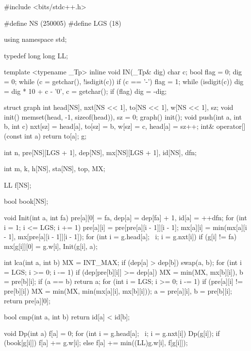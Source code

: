 \begin{cppcode}
#include <bits/stdc++.h>

#define NS (250005)
#define LGS (18)

using namespace std;

typedef long long LL;

template <typename _Tp>
inline void IN(_Tp& dig) {
  char c;
  bool flag = 0;
  dig = 0;
  while (c = getchar(), !isdigit(c))
    if (c == '-') flag = 1;
  while (isdigit(c)) dig = dig * 10 + c - '0', c = getchar();
  if (flag) dig = -dig;
}

struct graph {
  int head[NS], nxt[NS << 1], to[NS << 1], w[NS << 1], sz;
  void init() { memset(head, -1, sizeof(head)), sz = 0; }
  graph() { init(); }
  void push(int a, int b, int c) {
    nxt[sz] = head[a], to[sz] = b, w[sz] = c, head[a] = sz++;
  }
  int& operator[](const int a) { return to[a]; }
} g;

int n, pre[NS][LGS + 1], dep[NS], mx[NS][LGS + 1], id[NS], dfn;

int m, k, h[NS], sta[NS], top, MX;

LL f[NS];

bool book[NS];

void Init(int a, int fa) {
  pre[a][0] = fa, dep[a] = dep[fa] + 1, id[a] = ++dfn;
  for (int i = 1; i <= LGS; i += 1) {
    pre[a][i] = pre[pre[a][i - 1]][i - 1];
    mx[a][i] = min(mx[a][i - 1], mx[pre[a][i - 1]][i - 1]);
  }
  for (int i = g.head[a]; ~i; i = g.nxt[i])
    if (g[i] != fa) mx[g[i]][0] = g.w[i], Init(g[i], a);
}

int lca(int a, int b) {
  MX = INT_MAX;
  if (dep[a] > dep[b]) swap(a, b);
  for (int i = LGS; i >= 0; i -= 1)
    if (dep[pre[b][i]] >= dep[a]) MX = min(MX, mx[b][i]), b = pre[b][i];
  if (a == b) return a;
  for (int i = LGS; i >= 0; i -= 1)
    if (pre[a][i] != pre[b][i]) {
      MX = min(MX, min(mx[a][i], mx[b][i]));
      a = pre[a][i], b = pre[b][i];
    }
  return pre[a][0];
}

bool cmp(int a, int b) { return id[a] < id[b]; }

void Dp(int a) {
  f[a] = 0;
  for (int i = g.head[a]; ~i; i = g.nxt[i]) {
    Dp(g[i]);
    if (book[g[i]])
      f[a] += g.w[i];
    else
      f[a] += min((LL)g.w[i], f[g[i]]);
  }
}


\end{cppcode}
